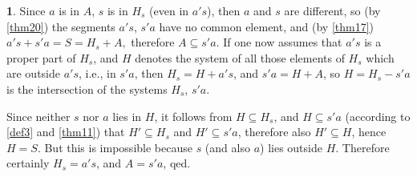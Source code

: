 \documentclass[leqno,hidelinks]{article}
\theoremstyle{definition}
\newtheorem{satz}{\protect\satzname}
\newcommand{\satzname}{}
\renewcommand{\satzname}{\hspace{-4pt}.\ Satz}%
\renewcommand{\satzname}{\hspace{-4pt}.\ Theorem}%
\newcommand{\partof}{\subseteq}
\newcommand{\sref}[1]{\underline{\ref{#1}}}%
\begin{document}
\begin{paracol}{2}
\begin{satz}
Since $a$ is in $A$, $s$ is in $H_s$ (even in $a's$), then $a$ and $s$ are
different, so (by \sref{thm20}) the segments $a's$, $s'a$ have no common element,
and (by \sref{thm17}) $a's+  s'a=S=H_s+ A,$ therefore $A \partof s'a$.
If one now assumes that $a's$ is a proper part of $H_s$, and $H$ denotes the
system of all those elements of $H_s$ which are outside $a's$, i.e., in $s'a$,
then $H_s = H+a's$, and $s'a = H + A$, so $H=H_s-s'a$ is the intersection of the
systems $H_s$, $s'a$.

Since neither $s$ nor $a$ lies in $H$, it follows from $H \partof H_s$, and
$H \partof s'a$ (according to \sref{def3} and \sref{thm11}) that $H' \partof H_s$
and $H' \partof s'a$, therefore also $H' \partof H$, hence $H = S$. But this is
impossible because $s$ (and also $a$) lies outside $H$. Therefore certainly
$H_s = a's$, and $A = s'a$, qed.
\end{satz}


\end{paracol}
\end{document}

